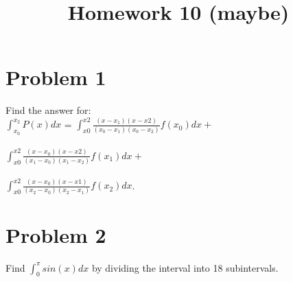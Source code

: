 \documentclass{article}
\title{ Homework 10 (maybe) }
\author{}
\begin{document}
\maketitle
\section{ Problem 1 }
Find the answer for:\\
$\int_{x_0}^{x_2} P(x)dx$ = $\int_{x0}^{x2} \frac{ (x-x_1)(x-x2) }{ (x_0-x_1)(x_0-x_2) } f(x_0)dx+$
\\
\\$\int_{x0}^{x2} \frac{ (x-x_0)(x-x2) }{ (x_1-x_0)(x_1-x_2) } f(x_1)dx+$
\\
\\$\int_{x0}^{x2} \frac{ (x-x_0)(x-x1) }{ (x_2-x_0)(x_2-x_1) } f(x_2)dx$.

\section{ Problem 2 }

Find $\int_{0}^{\pi} sin(x)dx $ by dividing the interval into 18 subintervals.
\end{document}
